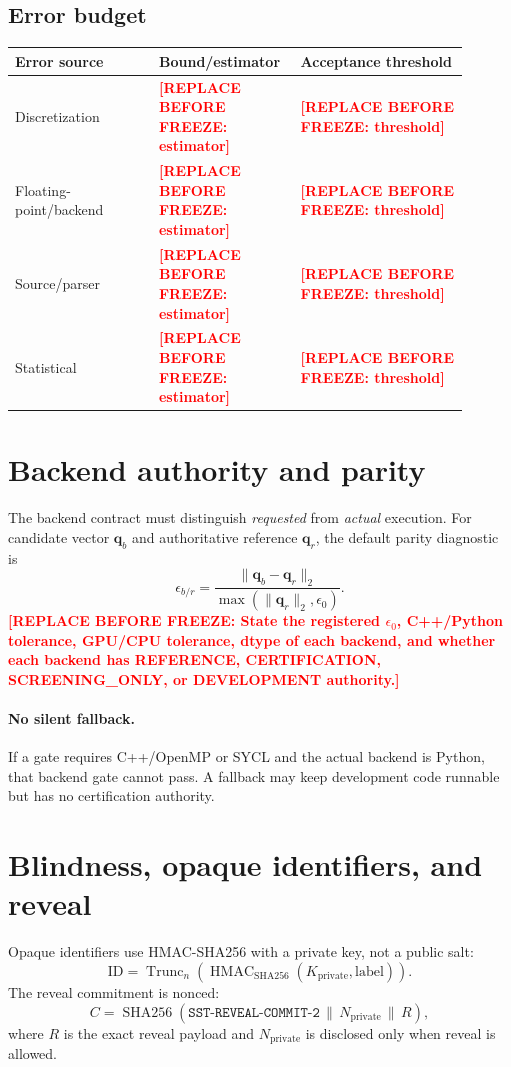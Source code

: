 \documentclass[11pt,a4paper]{article}
\newcommand{\SSTTODO}[1]{\ifmmode\text{\color{red}\bfseries TODO}\else\textcolor{red}{\textbf{[REPLACE BEFORE FREEZE: #1]}}\fi}
\begin{document}
\subsection{Error budget}
\begin{longtable}{p{0.30\linewidth}p{0.25\linewidth}p{0.35\linewidth}}
\toprule
Error source & Bound/estimator & Acceptance threshold \\
\midrule
Discretization & \SSTTODO{estimator} & \SSTTODO{threshold} \\
Floating-point/backend & \SSTTODO{estimator} & \SSTTODO{threshold} \\
Source/parser & \SSTTODO{estimator} & \SSTTODO{threshold} \\
Statistical & \SSTTODO{estimator} & \SSTTODO{threshold} \\
\bottomrule
\end{longtable}

\section{Backend authority and parity}
The backend contract must distinguish \emph{requested} from \emph{actual} execution. For candidate vector $\mathbf q_b$ and authoritative reference $\mathbf q_r$, the default parity diagnostic is
\begin{equation}
\epsilon_{b/r}=\frac{\|\mathbf q_b-\mathbf q_r\|_2}{\max(\|\mathbf q_r\|_2,\epsilon_0)}.
\end{equation}
\SSTTODO{State the registered $\epsilon_0$, C++/Python tolerance, GPU/CPU tolerance, dtype of each backend, and whether each backend has REFERENCE, CERTIFICATION, SCREENING\_ONLY, or DEVELOPMENT authority.}

\paragraph{No silent fallback.}
If a gate requires C++/OpenMP or SYCL and the actual backend is Python, that backend gate cannot pass. A fallback may keep development code runnable but has no certification authority.

\section{Blindness, opaque identifiers, and reveal}
Opaque identifiers use HMAC-SHA256 with a private key, not a public salt:
\begin{equation}
\mathrm{ID}=\operatorname{Trunc}_n\!\left(\operatorname{HMAC}_{\mathrm{SHA256}}(K_{\mathrm{private}},\mathrm{label})\right).
\end{equation}
The reveal commitment is nonced:
\begin{equation}
C=\operatorname{SHA256}(\texttt{SST-REVEAL-COMMIT-2}\,\|\,N_{\mathrm{private}}\,\|\,R),
\end{equation}
where $R$ is the exact reveal payload and $N_{\mathrm{private}}$ is disclosed only when reveal is allowed.
\end{document}
